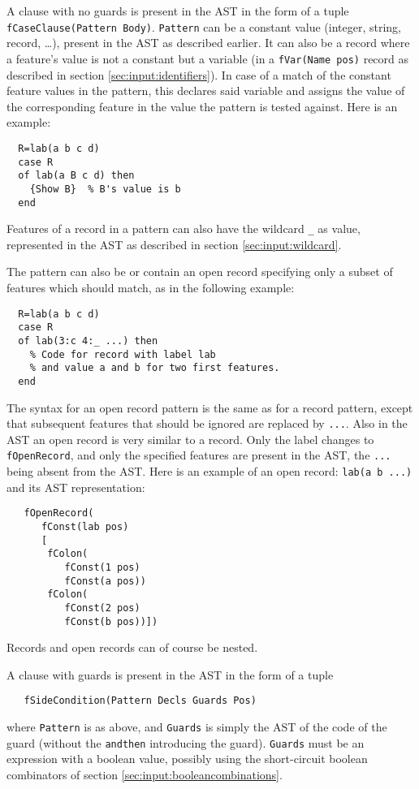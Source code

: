\documentclass[a4paper]{memoir}
\begin{document}
A clause with no guards is present in the AST in the form of a tuple \lstinline!fCaseClause(Pattern Body)!. \lstinline!Pattern! can be a constant value (integer, string, record, \ldots), present in the AST as described earlier. It can also be a record where a feature's value is not a constant but a variable (in a \lstinline!fVar(Name pos)! record as described in section \ref{sec:input:identifiers}). In case of a match of the constant feature values in the pattern, this declares said variable and assigns the value of the corresponding feature in the value the pattern is tested against. Here is an example:
\begin{lstlisting}
  R=lab(a b c d)
  case R
  of lab(a B c d) then
    {Show B}  % B's value is b
  end
\end{lstlisting}
Features of a record in a pattern can also have the wildcard \lstinline!_! as value, represented in the AST as described in section \ref{sec:input:wildcard}.

The pattern can also be or contain an open record specifying only a subset of features which should match, as in the following example:
\begin{lstlisting}
  R=lab(a b c d)
  case R
  of lab(3:c 4:_ ...) then
    % Code for record with label lab
    % and value a and b for two first features.
  end
\end{lstlisting}
The syntax for an open record pattern is the same as for a record pattern, except that subsequent features that should be ignored are replaced by \lstinline!...!. Also in the AST an open record is very similar to a record. Only the label changes to \lstinline!fOpenRecord!, and only the specified features are present in the AST, the \lstinline!...! being absent from the AST. Here is an example of an open record:
\lstinline!lab(a b ...)! 
and its AST representation:
\begin{lstlisting}
   fOpenRecord(
      fConst(lab pos)
      [
       fColon(
          fConst(1 pos)
          fConst(a pos))
       fColon(
          fConst(2 pos)
          fConst(b pos))])
\end{lstlisting}

Records and open records can of course be nested.

A clause with guards is present in the AST in the form of a tuple
\begin{lstlisting}
   fSideCondition(Pattern Decls Guards Pos)
\end{lstlisting}
where \lstinline!Pattern!
is as above,
and \lstinline!Guards! is simply the AST of the code of the guard (without the \lstinline!andthen! introducing the guard).
\lstinline!Guards! must be an expression with a boolean value, possibly using
the short-circuit boolean combinators of section \ref{sec:input:booleancombinations}.
\end{document}
